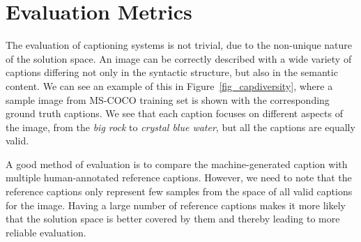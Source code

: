 \section{Evaluation Metrics} \label{sec:EvaluationMetrics} The evaluation of
captioning systems is not trivial, due to the non-unique nature of the
solution space.
An image can be correctly described with a wide variety of captions differing not
only in the syntactic structure, but also in the semantic content.
We can see an example of this in Figure~\ref{fig_capdiversity}, where a sample
image from MS-COCO training set is shown with the corresponding ground truth
captions.
We see that each caption focuses on different aspects of the image, from the
\emph{big rock} to \emph{crystal blue water}, but all the captions are equally
valid.

A good method of evaluation is to compare the machine-generated caption with
multiple human-annotated reference captions.
However, we need to note that the reference captions only represent few samples
from the space of all valid captions for the image.
Having a large number of reference captions makes it more likely that the
solution space is better covered by them and thereby leading to more reliable
evaluation.

